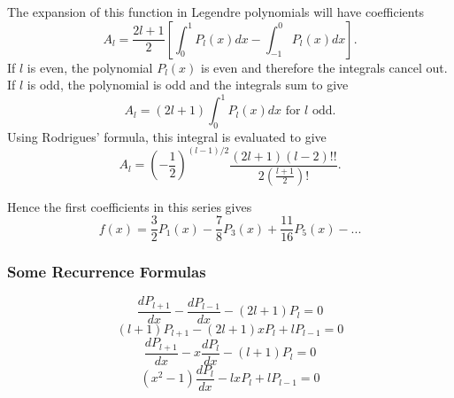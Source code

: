 The expansion of this function in Legendre polynomials will have coefficients
 \begin{equation}
 A_l = \frac{2l+1}{2} \left[ \int_0^1 P_l(x) dx - \int_{-1}^0 P_l(x) dx \right]. \label{eq:CoeffcientsExample1}
 \end{equation}
 If $l$ is even, the polynomial $P_l(x)$ is even and therefore the integrals cancel out. If $l$ is odd, the polynomial is odd and the integrals sum to give
  \begin{equation}
 A_l = (2l+1) \int_0^1 P_l(x) dx  \text{ for } l \text{ odd}. 
 \end{equation}
 Using Rodrigues' formula, this integral is evaluated to give
\begin{equation}
A_l = \left( -\frac{1}{2}\right)^{(l-1)/2} \frac{(2l+1)(l-2)!!}{2\left( \frac{l+1}{2}\right)!}.  \label{eq:CoefficientsExample2}
\end{equation}

Hence the first coefficients in this series gives
\begin{equation}
f(x) = \frac{3}{2} P_1 (x) - \frac{7}{8} P_3 (x) + \frac{11}{16} P_5 (x) - ... \label{eq:CoefficientsExample3}
\end{equation}
\subsubsection{Some Recurrence Formulas}

\begin{equation}
\frac{dP_{l+1}}{dx} - \frac{dP_{l-1}}{dx} - (2l+1) P_l = 0
\end{equation}
\begin{equation}
(l+1)P_{l+1} - (2l+1)xP_l + lP_{l-1} = 0
\end{equation}
\begin{equation}
\frac{dP_{l+1}}{dx} - x\frac{dP_{l}}{dx} - (l+1) P_l = 0
\end{equation}
\begin{equation}
(x^2 - 1) \frac{dP_l}{dx} - lxP_l + lP_{l-1} = 0
\end{equation}

